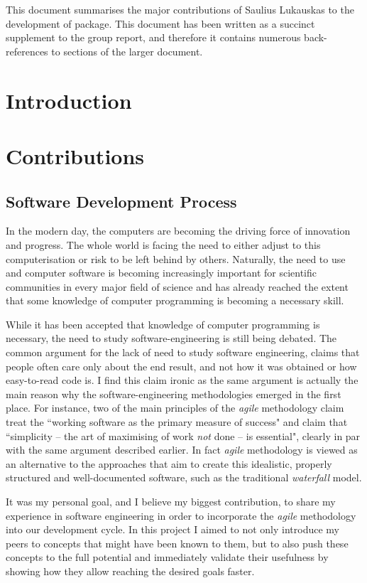 This document summarises the major contributions of Saulius Lukauskas
to the development of \means{} package.
This document has been written as a succinct supplement to the group report, and therefore it contains numerous back-references to sections of the larger document.

\section{Introduction}

\section{Contributions}
\subsection{Software Development Process}

In the modern day, the computers are becoming the driving force of innovation and progress. 
The whole world is facing the need to either adjust to this computerisation or risk to be left behind by others.
Naturally, the need to use and computer software is becoming increasingly important for scientific communities in every major field of science and has already reached the extent that some knowledge of computer programming is becoming a necessary skill.

While it has been accepted that knowledge of computer programming is necessary, the need to study software-engineering is still being debated. 
The common argument for the lack of need to study software engineering, claims that people often care only about the end result, and not how it was obtained or how easy-to-read code is. 
I find this claim ironic as the same argument is actually the main reason why the software-engineering methodologies emerged in the first place. 
For instance, two of the main principles of the \emph{agile} methodology\cite{_manifesto_????} claim treat the ``working software as the primary measure of success" and claim that ``simplicity -- the art of maximising of work \emph{not} done -- is essential"\cite{paulk_agile_2002}, clearly in par with the same argument described earlier. 
In fact \emph{agile} methodology is viewed as an alternative to the approaches that aim to create this idealistic, properly structured and well-documented software, such as the traditional \emph{waterfall} model.

It was my personal goal, and I believe my biggest contribution, to share my experience in software engineering in order to incorporate the \emph{agile} methodology into our development cycle. 
In this project I aimed to not only introduce my peers to concepts that might have been known to them, but to also push these concepts to the full potential and immediately validate their usefulness by showing how they allow reaching the desired goals faster. 

